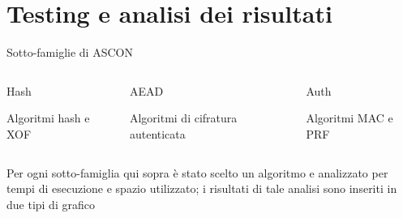 \section{Testing e analisi dei risultati}


\begin{frame}{Sotto-famiglie di ASCON}
    \begin{columns}

    \begin{column}{0.28\textwidth}

    \begin{block}{Hash}
        \begin{center}
            Algoritmi hash e XOF
        \end{center}
    \end{block}

    \end{column}
    
    \begin{column}{0.38\textwidth}

    \begin{block}{AEAD}
        \begin{center}
            Algoritmi di cifratura autenticata
        \end{center}
    \end{block}

    \end{column}

    \begin{column}{0.28\textwidth}

    \begin{block}{Auth}
        \begin{center}
            Algoritmi MAC e PRF
        \end{center}
    \end{block}

    \end{column}

    \end{columns}

    \vspace{14pt}

    \begin{center}
        Per ogni sotto-famiglia qui sopra è stato scelto un algoritmo e analizzato per tempi di esecuzione e spazio utilizzato; i risultati di tale analisi sono inseriti in due tipi di grafico
    \end{center}


\end{frame}
